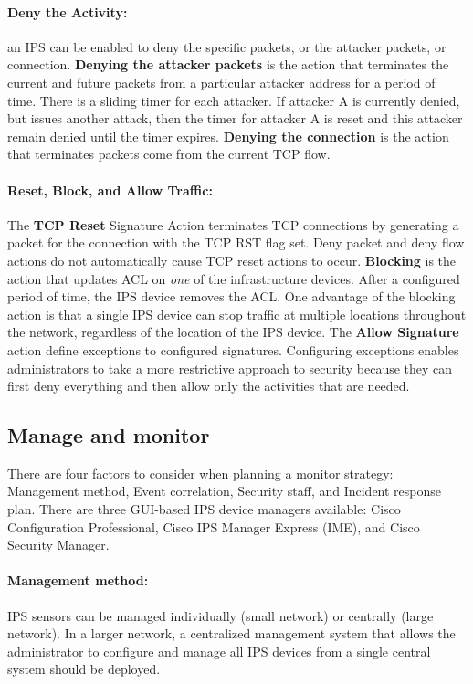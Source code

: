 \paragraph{Deny the Activity:} an IPS can be enabled to deny the specific packets, or the attacker packets, or connection. \textbf{Denying the attacker packets} is the action that terminates the current and future packets from a particular attacker address for a period of time. There is a sliding timer for each attacker. If attacker A is currently denied, but issues another attack, then the timer for attacker A is reset and this attacker remain denied until the timer expires. \textbf{Denying the connection} is the action that terminates packets come from the current TCP flow.

\paragraph{Reset, Block, and Allow Traffic:} The \textbf{TCP Reset} Signature Action terminates TCP connections by generating a packet for the connection with the TCP RST flag set. Deny packet and deny flow actions do not automatically cause TCP reset actions to occur. \textbf{Blocking} is the action that updates ACL on \emph{one} of the infrastructure devices. After a configured period of time, the IPS device removes the ACL. One advantage of the blocking action is that a single IPS device can stop traffic at multiple locations throughout the network, regardless of the location of the IPS device. The \textbf{Allow Signature} action define exceptions to configured signatures. Configuring exceptions enables administrators to take a more restrictive approach to security because they can first deny everything and then allow only the activities that are needed.

\subsection{Manage and monitor}

There are four factors to consider when planning a monitor strategy: Management method, Event correlation, Security staff, and Incident response  plan. There are three GUI-based IPS device managers available: Cisco Configuration Professional, Cisco IPS Manager Express (IME), and Cisco Security Manager.

\paragraph{Management method:} IPS sensors can be managed individually (small network) or centrally (large network).  In a larger network, a centralized management system that allows the administrator to configure and manage all IPS devices from a single central system should be deployed. 


